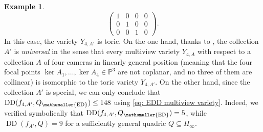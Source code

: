 \documentclass[11pt,reqno]{amsart}
\numberwithin{equation}{section}
\theoremstyle{plain}
\numberwithin{theorem}{section}
\theoremstyle{definition}
\newtheorem{example}[theorem]{Example}
\renewcommand{\P}{\mathbb{P}}
\newcommand{\DD}{\operatorname{DD}}
\newcommand{\mED}{\mathsmaller{\mathrm{ED}}}
\begin{document}
\begin{example}
\[\begin{pmatrix}
1 & 0 & 0 & 0 \\
0 & 1 & 0 & 0 \\
0 & 0 & 1 & 0 
\end{pmatrix}.
\]
In this case, the variety $Y_{4,A'}$ is toric.
On the one hand, thanks to \cite[Remark 4.4]{aholt2013hilbert}, the collection $A'$ is {\em universal} in the sense that every multiview variety $Y_{4,A}$ with respect to a collection $A$ of four cameras in linearly general position (meaning that the four focal points $\ker A_1,\dots,\ker A_4\in\P^3$ are not coplanar, and no three of them are collinear) is isomorphic to the toric variety $Y_{4,A'}$. On the other hand, since the collection $A'$ is special, we can only conclude that $\DD(f_{4,A'},Q_\mED)\le 148$ using \eqref{eq: EDD multiview variety}. Indeed, we verified symbolically that $\DD(f_{4,A'},Q_\mED)=5$, while $\DD(f_{A'},Q)=9$ for a sufficiently general quadric $Q\subseteq H_\infty$.


\end{example}
\end{document}
